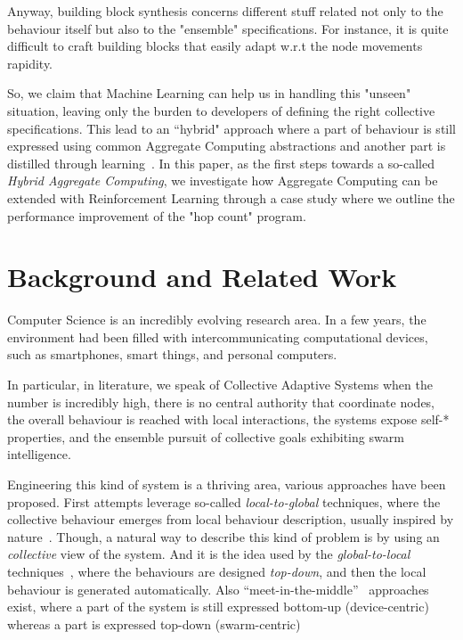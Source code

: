 \documentclass[conference]{IEEEtran}
\newcommand{\todos}[1]{\todo[inline, color=cyan]{\textbf{TODO}: #1}}
\newcommand{\hybridaggregate}{\textit{Hybrid Aggregate Computing}}
\begin{document}
Anyway, building block synthesis concerns different stuff related not only to the behaviour itself
 but also to the "ensemble" specifications. 
 For instance, it is quite difficult to craft building blocks
 that easily adapt w.r.t the node movements rapidity.

So, we claim that Machine Learning can help us in handling this "unseen" situation, leaving only the burden
 to developers of defining the right collective specifications.
%
This lead to an ``hybrid" approach where a part of behaviour is still expressed using common 
 Aggregate Computing abstractions and another part is distilled through learning~\cite{research}.
%
In this paper, as the first steps towards a so-called \hybridaggregate{}, we investigate how Aggregate Computing can be
 extended with Reinforcement Learning through a case
 study where we outline the performance improvement of the "hop count" program.
\todos{Outline}

\section{Background and Related Work}

Computer Science is an incredibly evolving research area. 
 In a few years, the environment had been filled with intercommunicating computational devices, such as smartphones, smart things, and personal computers.

In particular, in literature, we speak of Collective Adaptive Systems
 when the number is incredibly high, there is no central authority that coordinate nodes,
 the overall behaviour is reached with local interactions, the systems expose self-* properties,
 and the ensemble pursuit of collective goals
 exhibiting swarm intelligence.
 
Engineering this kind of system is a thriving area, various approaches have been proposed.
 First attempts leverage so-called \textit{local-to-global} techniques, where the collective behaviour emerges from local behaviour description, 
 usually inspired by nature~\cite{DBLP:journals/swarm/BrambillaFBD13}. 
%
Though, a natural way to describe this kind of problem is by using an \textit{collective} view of the system.
 And it is the idea used by the \textit{global-to-local} techniques~\cite{DBLP:journals/jlap/ViroliBDACP19,DBLP:journals/scp/AlrahmanNL20, DBLP:conf/cbse/BuresGHKKP13}, where the behaviours are designed \textit{top-down},
 and then the local behaviour is generated automatically. 
% 
Also ``meet-in-the-middle''~\cite{DBLP:journals/computer/PinciroliB16} approaches exist, where
 a part of the system is still expressed bottom-up (device-centric) whereas a part is expressed top-down (swarm-centric)
\end{document}

